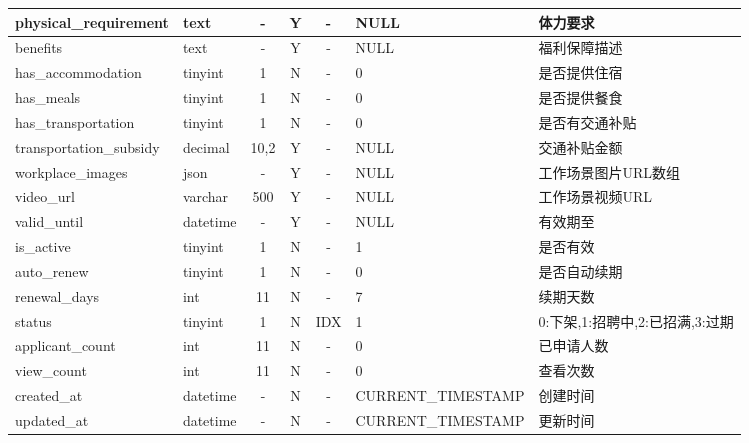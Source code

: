 \documentclass[UTF8,a4paper,12pt]{article}
\begin{document}
\begin{table}[H]
\begin{tabular}{|l|l|c|c|c|l|l|}
        physical\_requirement & text & - & Y & - & NULL & 体力要求 \\ \hline
        benefits & text & - & Y & - & NULL & 福利保障描述 \\ \hline
        has\_accommodation & tinyint & 1 & N & - & 0 & 是否提供住宿 \\ \hline
        has\_meals & tinyint & 1 & N & - & 0 & 是否提供餐食 \\ \hline
        has\_transportation & tinyint & 1 & N & - & 0 & 是否有交通补贴 \\ \hline
        transportation\_subsidy & decimal & 10,2 & Y & - & NULL & 交通补贴金额 \\ \hline
        workplace\_images & json & - & Y & - & NULL & 工作场景图片URL数组 \\ \hline
        video\_url & varchar & 500 & Y & - & NULL & 工作场景视频URL \\ \hline
        valid\_until & datetime & - & Y & - & NULL & 有效期至 \\ \hline
        is\_active & tinyint & 1 & N & - & 1 & 是否有效 \\ \hline
        auto\_renew & tinyint & 1 & N & - & 0 & 是否自动续期 \\ \hline
        renewal\_days & int & 11 & N & - & 7 & 续期天数 \\ \hline
        status & tinyint & 1 & N & IDX & 1 & 0:下架,1:招聘中,2:已招满,3:过期 \\ \hline
        applicant\_count & int & 11 & N & - & 0 & 已申请人数 \\ \hline
        view\_count & int & 11 & N & - & 0 & 查看次数 \\ \hline
        created\_at & datetime & - & N & - & CURRENT\_TIMESTAMP & 创建时间 \\ \hline
        updated\_at & datetime & - & N & - & CURRENT\_TIMESTAMP & 更新时间 \\ \hline
    \end{tabular}
\end{table}
\end{document}
